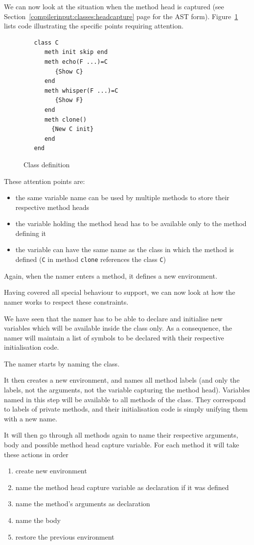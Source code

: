 \documentclass[a4paper]{memoir}
\begin{document}
We can now look at the situation when the method head is captured (see
Section~\ref{compilerinput:classes:headcapture} page
\pageref{compilerinput:classes:headcapture} for the AST form).
Figure~\ref{fig:attentionpoints} lists code illustrating the specific points requiring attention.
\begin{figure}[h]
\begin{lstlisting}
   class C
      meth init skip end
      meth echo(F ...)=C
         {Show C}
      end
      meth whisper(F ...)=C
         {Show F}
      end
      meth clone()
        {New C init}
      end
   end
\end{lstlisting}
\caption{Class definition}
\label{fig:attentionpoints}
\end{figure}

These attention points are:
\begin{itemize}
  \item the same variable name can be used by multiple methods to store their
    respective method heads
  \item the variable holding the method head has to be available only to the
    method defining it
  \item the variable can have the same name as the class in which the method is
    defined (\lstinline!C! in method \lstinline!clone! references the class \lstinline!C!)
\end{itemize}

Again, when the namer enters a method, it defines a new environment.

Having covered all special behaviour to support, we can now look at how the namer works to 
respect these constraints.

We have seen that the namer has to be able to declare and initialise new
variables which will be available inside the class only. As a consequence, the
namer will maintain a list of symbols to be declared with their respective
initialisation code.

The namer starts by naming the class.

It then creates a new environment, and names all method labels (and only the
labels, not the arguments, not the variable capturing the method head).
Variables named in this step will be available to all methods of the class.
They correspond to labels of private methods, and their initialisation code is
simply unifying them with a new name.

It will then go through all methods again to name their respective arguments,
body and possible method head capture variable. For each method it will take
these actions in order
\begin{enumerate}
  \item create new environment
  \item name the method head capture variable as declaration if it was defined
  \item name the method's arguments as declaration
  \item name the body
  \item restore the previous environment
\end{enumerate}
\end{document}
